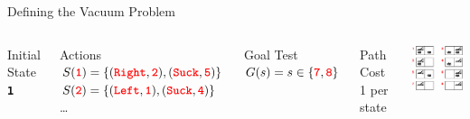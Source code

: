 \documentclass[14pt]{beamer}
\newcommand{\key}[1]{\mbox{\texttt{\bfseries\color{red}#1}}}
\begin{document}
\begin{frame}{Defining the Vacuum Problem}
	\begin{columns}
			\begin{block}{Initial State}
				\key{1}
			\end{block}
			\begin{block}{Actions}
				\small
	      $S(\key{1}) = \{(\key{Right}, \key{2}), (\key{Suck}, \key{5})\}$ \\
	      $S(\key{2}) = \{(\key{Left}, \key{1}), (\key{Suck}, \key{4})\}$ \\
	      \ldots
			\end{block}
			\begin{block}{Goal Test}
				$G(s) = s \in \{\key{7}, \key{8}\}$
			\end{block}
			\begin{block}{Path Cost}
				1 per state
			\end{block}
			\includegraphics[width=2.1in]{vacuum-space.pdf}
	\end{columns}
\end{frame}
\end{document}
